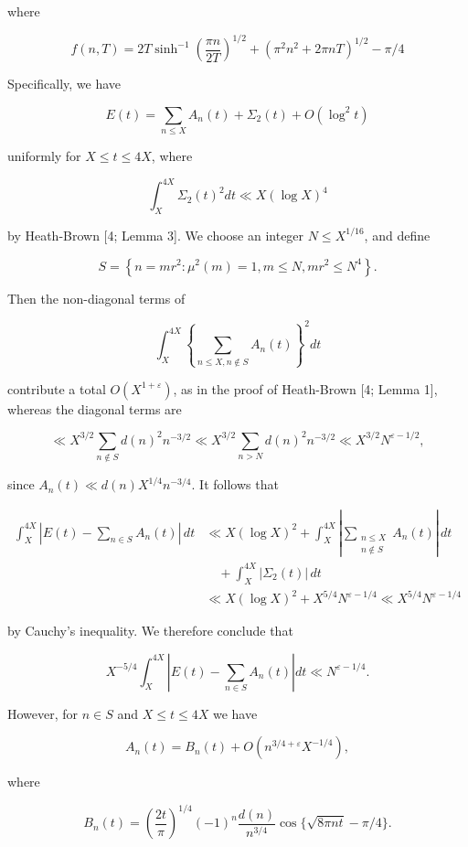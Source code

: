\documentclass[10pt]{article}
\begin{document}
where

$$
f(n, T)=2 T \sinh ^{-1}\left(\frac{\pi n}{2 T}\right)^{1 / 2}+\left(\pi^{2} n^{2}+2 \pi n T\right)^{1 / 2}-\pi / 4
$$

Specifically, we have

$$
E(t)=\sum_{n \leq X} A_{n}(t)+\Sigma_{2}(t)+O\left(\log ^{2} t\right)
$$

uniformly for $X \leq t \leq 4 X$, where

$$
\int_{X}^{4 X} \Sigma_{2}(t)^{2} d t \ll X(\log X)^{4}
$$

by Heath-Brown [4; Lemma 3]. We choose an integer $N \leq X^{1 / 16}$, and define

$$
S=\left\{n=m r^{2}: \mu^{2}(m)=1, m \leq N, m r^{2} \leq N^{4}\right\} .
$$

Then the non-diagonal terms of

$$
\int_{X}^{4 X}\left\{\sum_{n \leq X, n \notin S} A_{n}(t)\right\}^{2} d t
$$

contribute a total $O\left(X^{1+\varepsilon}\right)$, as in the proof of Heath-Brown [4; Lemma 1], whereas the diagonal terms are

$$
\ll X^{3 / 2} \sum_{n \notin S} d(n)^{2} n^{-3 / 2} \ll X^{3 / 2} \sum_{n>N} d(n)^{2} n^{-3 / 2} \ll X^{3 / 2} N^{\varepsilon-1 / 2},
$$

since $A_{n}(t) \ll d(n) X^{1 / 4} n^{-3 / 4}$. It follows that

$$
\begin{aligned}
\int_{X}^{4X}\left|E(t)-\sum_{n \in S}A_{n}(t)\right|\,dt
&\ll X(\log X)^{2}
 +\int_{X}^{4X}\left|\sum_{\substack{n \leq X\\ n \notin S}}A_{n}(t)\right|\,dt \\
&\quad+\int_{X}^{4X}|\Sigma_{2}(t)|\,dt \\
&\ll X(\log X)^{2}+X^{5/4}N^{\varepsilon-1/4}
 \ll X^{5/4}N^{\varepsilon-1/4}
\end{aligned}
$$

by Cauchy's inequality. We therefore conclude that

$$
X^{-5 / 4} \int_{X}^{4 X}\left|E(t)-\sum_{n \in S} A_{n}(t)\right| d t \ll N^{\varepsilon-1 / 4} .
$$

However, for $n \in S$ and $X \leq t \leq 4 X$ we have

$$
A_{n}(t)=B_{n}(t)+O\left(n^{3 / 4+\varepsilon} X^{-1 / 4}\right),
$$

where

$$
B_{n}(t)=\left(\frac{2 t}{\pi}\right)^{1 / 4}(-1)^{n} \frac{d(n)}{n^{3 / 4}} \cos \{\sqrt{8 \pi n t}-\pi / 4\} .
$$
\end{document}
